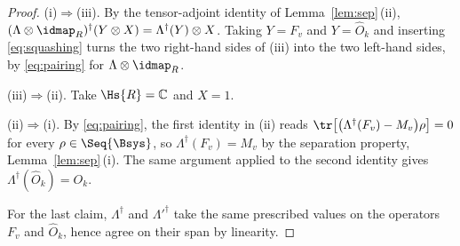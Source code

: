 \begin{proof}
(i)$\Rightarrow$(iii). By the tensor-adjoint identity of
Lemma~\ref{lem:sep}\,(ii),
$(\Lambda\otimes\idmap_R)^{\dagger}(Y\otimes X)=\Lambda^{\dagger}(Y)\otimes X$.
Taking $Y=F_v$ and $Y=\hat O_k$ and inserting \eqref{eq:squashing} turns the
two right-hand sides of (iii) into the two left-hand sides, by
\eqref{eq:pairing} for $\Lambda\otimes\idmap_R$.

(iii)$\Rightarrow$(ii). Take $\Hs{R}=\mathbb{C}$ and $X=1$.

(ii)$\Rightarrow$(i). By \eqref{eq:pairing}, the first identity in (ii) reads
$\tr\big[\big(\Lambda^{\dagger}(F_v)-M_v\big)\rho\big]=0$ for every
$\rho\in\Seq{\Bsys}$, so $\Lambda^{\dagger}(F_v)=M_v$ by the separation
property, Lemma~\ref{lem:sep}\,(i). The same argument applied to the second
identity gives $\Lambda^{\dagger}(\hat O_k)=O_k$.

For the last claim, $\Lambda^{\dagger}$ and $\Lambda'^{\dagger}$ take the same
prescribed values on the operators $F_v$ and $\hat O_k$, hence agree on their
span by linearity.
\end{proof}
